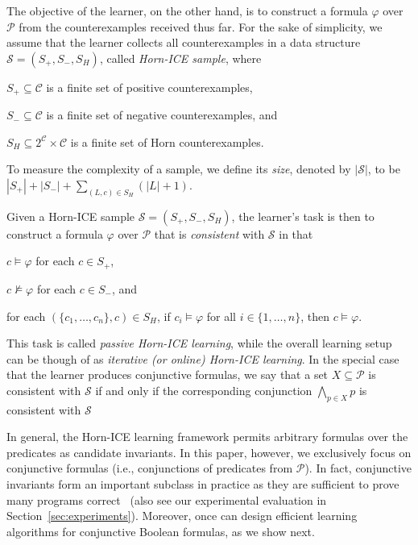 The objective of the learner, on the other hand, is to construct a formula $\varphi$ over $\mathcal P$ from the counterexamples received thus far.
For the sake of simplicity, we assume that the learner collects all counterexamples in a data structure $\mathcal S = (S_+, S_-, S_H)$, called \emph{Horn-ICE sample}, where
\begin{enumerate*}[label={(\alph*)}]
    \item $S_+ \subseteq \mathcal C$ is a finite set of positive counterexamples,
    \item $S_- \subseteq \mathcal C$ is a finite set of negative counterexamples, and
    \item $S_H \subseteq 2^\mathcal C \times \mathcal C$ is a finite set of Horn counterexamples.
\end{enumerate*}
To measure the complexity of a sample, we define its \emph{size}, denoted by $|\mathcal S|$, to be $|S_+| + |S_-| + \sum_{(L, c) \in S_H} (|L| + 1)$.

Given a Horn-ICE sample $\mathcal S = (S_+, S_-, S_H)$, the learner's task is then to construct a formula $\varphi$ over $\mathcal P$ that is \emph{consistent} with $\mathcal S$ in that
\begin{enumerate*}[label={(\alph*)}]
    \item $c \models \varphi$ for each $c \in S_+$,
    \item $c\not \models \varphi$ for each $c \in S_-$, and
    \item for each $(\{ c_1, \ldots, c_n \}, c) \in S_H$, if $c_i \models \varphi$ for all $i \in \{ 1, \ldots, n \}$, then $c \models \varphi$.
\end{enumerate*}
This task is called \emph{passive Horn-ICE learning}, while the overall learning setup can be though of as \emph{iterative (or online) Horn-ICE learning}.
In the special case that the learner produces conjunctive formulas, we say that a set $X \subseteq \mathcal P$ is consistent with $\mathcal S$ if and only if the corresponding conjunction $\bigwedge_{p \in X} p$ is consistent with $\mathcal S$


In general, the Horn-ICE learning framework permits arbitrary formulas over the predicates as candidate invariants.
In this paper, however, we exclusively focus on conjunctive formulas (i.e., conjunctions of predicates from $\mathcal P$). %
In fact, conjunctive invariants form an important subclass in practice as they are sufficient to prove many programs correct~\cite{DBLP:conf/fm/FlanaganL01,DBLP:conf/tacas/Neider0MS018} (also see our experimental evaluation in Section~\ref{sec:experiments}).
Moreover, once can design efficient learning algorithms for conjunctive Boolean formulas, as we show next.


